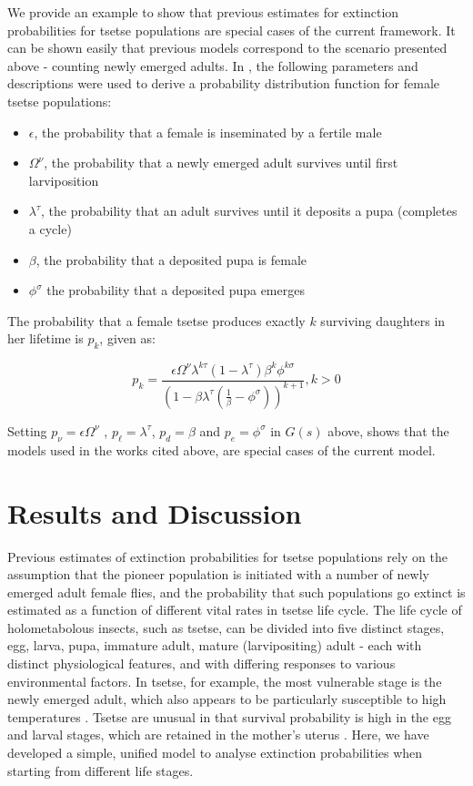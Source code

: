 \documentclass[smallextended]{svjour3}
\begin{document}
We provide an example to show that previous estimates for extinction probabilities for tsetse populations are special cases of the current framework. It can be shown easily that previous models \cite{Hargrove2005a,Kajunguri2019,Are2019} correspond to the scenario presented above - counting newly emerged adults. In \cite{Are2019}, the following parameters and descriptions were used to derive a probability distribution function for female tsetse populations: 
\begin{itemize}
	\item $\epsilon$, the probability that a female is inseminated by a fertile male 
	\item $\Omega^{\nu}$,  the probability that a newly emerged adult survives until first larviposition
	\item $ \lambda^{\tau}$, the probability that an adult survives until it deposits a pupa (completes a cycle)
	\item $\beta$,  the probability that a deposited pupa is female 
	\item $\phi^{\sigma}$  the probability that a deposited pupa emerges
\end{itemize}

The probability that a female tsetse produces exactly $k$ surviving daughters in her lifetime is $p_{k}$, given as:

\begin{equation}
	\label{Johnframework}
	p_{k}= \frac{\epsilon \Omega^{\nu}\lambda^{k\tau}(1-\lambda^{\tau})\beta^{k}\phi^{k\sigma}}{(1-\beta \lambda^\tau(\frac{1}{\beta} -\phi^{\sigma}))^{k+1}},   k>0   
\end{equation}

Setting  $ p_{\nu}= \epsilon \Omega^{\nu}$ , $p_{\ell} =\lambda^{\tau} $, $p_{d}=\beta$  and $p_{e} = \phi^{\sigma} $ in  $G(s)$ above,   shows that the models used in the works cited above, are special cases of the current model. 

\section{Results and Discussion}
\label{section8}

Previous estimates of extinction probabilities for tsetse populations rely on the assumption that the pioneer population is initiated with a number of newly emerged adult female flies, and the probability that such populations go extinct is estimated as a function of different vital rates in tsetse life cycle. The life cycle of holometabolous insects, such as tsetse, can be divided into five distinct stages, egg, larva, pupa, immature adult, mature (larvipositing) adult - each with distinct physiological features, and with differing responses to various environmental factors. In tsetse, for example, the most vulnerable stage is the newly emerged adult, which also appears to be particularly susceptible to high temperatures \cite{Ackley2017a}. Tsetse are unusual in that survival probability is high in the egg and larval stages, which are retained in the mother's uterus \cite{Hargrove1999a}. Here, we have developed a simple, unified model to analyse extinction probabilities when starting from different life stages. 
\end{document}
